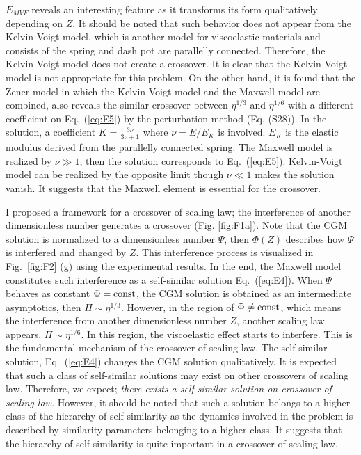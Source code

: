 \documentclass[default,iicol,10pt]{sn-jnl}%
\theoremstyle{thmstyleone}%
\theoremstyle{thmstyletwo}%
\theoremstyle{thmstylethree}%
\begin{document}
$E_{MVF}$ reveals an interesting feature as it transforms its form qualitatively depending on $Z$. It should be noted that such behavior does not appear from the Kelvin-Voigt model, which is another model for viscoelastic materials and consists of the spring and dash pot are parallelly connected. Therefore, the Kelvin-Voigt model does not create a crossover. It is clear that the Kelvin-Voigt model is not appropriate for this problem\cite{KVm}. On the other hand, it is found that the Zener model in which the Kelvin-Voigt model and the Maxwell model are combined, also reveals the similar crossover between $\eta^{1/3}$ and $\eta^{1/6}$ with a different coefficient on Eq.~(\ref{eq:E5}) by the perturbation method (Eq. (S28))\cite{Zm}. In the solution, a coefficient $K = \frac{3 \nu}{3 \nu +1}$ where $\nu = E/E_K$ is involved. $E_K$ is the elastic modulus derived from the parallelly connected spring. The Maxwell model is realized by $\nu \gg 1$, then the solution corresponds to Eq.~(\ref{eq:E5}). Kelvin-Voigt model can be realized by the opposite limit though $\nu \ll 1$ makes the solution vanish. It suggests that the Maxwell element is essential for the crossover. 

I proposed a framework for a crossover of scaling law; the interference of another dimensionless number generates a crossover (Fig. \ref{fig:F1a}). Note that the CGM solution is normalized to a dimensionless number $\Psi$, then $\Phi(Z)$ describes how $\Psi$ is interfered and changed by $Z$. This interference process is visualized in Fig.~\ref{fig:F2} (g) using the experimental results. In the end, the Maxwell model constitutes such interference as a self-similar solution Eq.~(\ref{eq:E4}). When $\Psi$ behaves as constant $\Phi = {\rm const}$,  the CGM solution is obtained as an intermediate asymptotics, then $\Pi \sim \eta^{1/3}$. However, in the region of $\Phi \neq {\rm const} $, which means the interference from another dimensionless number $Z$, another scaling law appears, $\Pi \sim \eta^{1/6}$. In this region, the viscoelastic effect starts to interfere. This is the fundamental mechanism of the crossover of scaling law. The self-similar solution,  Eq.~(\ref{eq:E4}) changes the CGM solution qualitatively. It is expected that such a class of self-similar solutions may exist on other crossovers of scaling law. Therefore, we expect; {\it there exists a self-similar solution on crossover of scaling law.} However, it should be noted that such a solution belongs to a higher class of the hierarchy of self-similarity as the dynamics involved in the problem is described by similarity parameters belonging to a higher class. It suggests that the hierarchy of self-similarity is quite important in a crossover of scaling law. 
\end{document}
